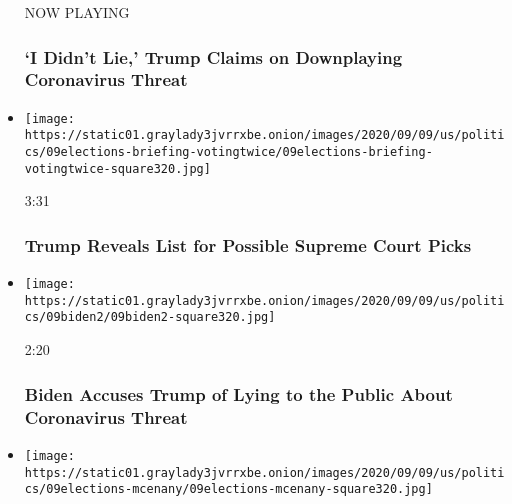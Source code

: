 \begin{itemize}
  NOW PLAYING

  \hypertarget{i-didnt-lie-trump-claims-on-downplaying-coronavirus-threat-2}{%
  \subsubsection{`I Didn't Lie,' Trump Claims on Downplaying Coronavirus
  Threat}\label{i-didnt-lie-trump-claims-on-downplaying-coronavirus-threat-2}}
\item
  \href{https://www.nytimes3xbfgragh.onion/video/us/politics/100000007332233/trump-supreme-court-list.html?action=click\&module=video-series-bar\&region=header\&pgtype=Article\&playlistId=video/us-politics}{}

  \texttt{[image: https://static01.graylady3jvrrxbe.onion/images/2020/09/09/us/politics/09elections-briefing-votingtwice/09elections-briefing-votingtwice-square320.jpg]}

  3:31

  \hypertarget{trump-reveals-list-for-possible-supreme-court-picks}{%
  \subsubsection{Trump Reveals List for Possible Supreme Court
  Picks}\label{trump-reveals-list-for-possible-supreme-court-picks}}
\item
  \href{https://www.nytimes3xbfgragh.onion/video/us/politics/100000007331572/biden-trump-woodward-covid-michigan.html?action=click\&module=video-series-bar\&region=header\&pgtype=Article\&playlistId=video/us-politics}{}

  \texttt{[image: https://static01.graylady3jvrrxbe.onion/images/2020/09/09/us/politics/09biden2/09biden2-square320.jpg]}

  2:20

  \hypertarget{biden-accuses-trump-of-lying-to-the-public-about-coronavirus-threat}{%
  \subsubsection{Biden Accuses Trump of Lying to the Public About
  Coronavirus
  Threat}\label{biden-accuses-trump-of-lying-to-the-public-about-coronavirus-threat}}
\item
  \href{https://www.nytimes3xbfgragh.onion/video/us/politics/100000007331976/mcenany-trump-covid-virus.html?action=click\&module=video-series-bar\&region=header\&pgtype=Article\&playlistId=video/us-politics}{}

  \texttt{[image: https://static01.graylady3jvrrxbe.onion/images/2020/09/09/us/politics/09elections-mcenany/09elections-mcenany-square320.jpg]}


\end{itemize}
